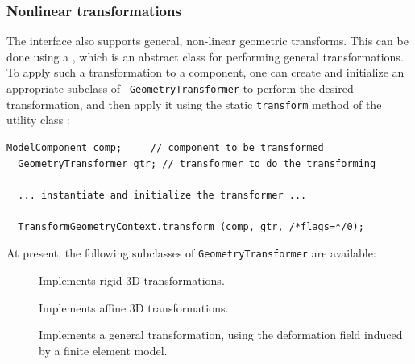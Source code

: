 \subsubsection{Nonlinear transformations}

The 
interface also supports general, non-linear geometric transforms.
This can be done using a
, which is an
abstract class for performing general transformations.  To apply such
a transformation to a component, one can create and initialize an appropriate
subclass of {\tt
GeometryTransformer} to perform the desired transformation, and
then apply it using the static {\tt transform} method of the utility class 
:
%
\begin{lstlisting}[]
  ModelComponent comp;     // component to be transformed
  GeometryTransformer gtr; // transformer to do the transforming

  ... instantiate and initialize the transformer ...

  TransformGeometryContext.transform (comp, gtr, /*flags=*/0);
\end{lstlisting}
%

At present, the following subclasses of {\tt GeometryTransformer} are
available:

\begin{description}

\item[]\mbox{}

Implements rigid 3D transformations.

\item[]\mbox{}

Implements affine 3D transformations.

\item[]\mbox{}

Implements a general transformation, using the deformation field
induced by a finite element model. 

\end{description}

